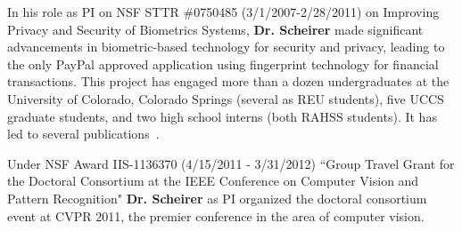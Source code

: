 In his role as PI on NSF STTR \#0750485 (3/1/2007-2/28/2011) on Improving Privacy and Security of Biometrics Systems, \textbf{Dr. Scheirer} made significant advancements in biometric-based technology for security and privacy, leading to the only PayPal approved application using fingerprint technology for financial transactions. This project has engaged more than a dozen undergraduates at the University of Colorado, Colorado Springs (several as REU students), five UCCS graduate students, and two high school interns (both RAHSS students). It has led to several publications~\cite{biotoken-07, cracking, biocrypt, bipartite-icb-09, BKI-Wifs, scheirer_2012_bki}.

Under NSF Award IIS-1136370 (4/15/2011 - 3/31/2012) ``Group Travel Grant for the Doctoral Consortium at the IEEE Conference on Computer Vision and Pattern Recognition" \textbf{Dr. Scheirer} as PI organized the doctoral consortium event at CVPR 2011, the premier conference in the area of computer vision.
